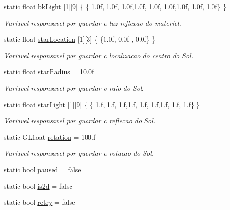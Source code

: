 \begin{DoxyCompactItemize}
static float \mbox{\hyperlink{class_scene_texture_a26f87539887244bc249e9ad4e33edb6f}{bk\+Light}} \mbox{[}1\mbox{]}\mbox{[}9\mbox{]} \{ \{ 1.\+0f, 1.\+0f, 1.\+0f,1.\+0f, 1.\+0f, 1.\+0f,1.\+0f, 1.\+0f, 1.\+0f\} \}
\begin{DoxyCompactList}\small\item\em Variavel responsavel por guardar a luz reflexao do material. \end{DoxyCompactList}\item 
static float \mbox{\hyperlink{class_scene_texture_a1987402ddcabace429e49b7f00823b3b}{star\+Location}} \mbox{[}1\mbox{]}\mbox{[}3\mbox{]} \{ \{0.\+0f, 0.\+0f , 0.\+0f\} \}
\begin{DoxyCompactList}\small\item\em Variavel responsavel por guardar a localizacao do centro do Sol. \end{DoxyCompactList}\item 
static float \mbox{\hyperlink{class_scene_texture_a79a357a19513f3fe334e44e415aa1725}{star\+Radius}} = 10.\+0f
\begin{DoxyCompactList}\small\item\em Variavel responsavel por guardar o raio do Sol. \end{DoxyCompactList}\item 
static float \mbox{\hyperlink{class_scene_texture_a07e5ffc66ac2eeeac00400230340a036}{star\+Light}} \mbox{[}1\mbox{]}\mbox{[}9\mbox{]} \{ \{ 1.f, 1.f, 1.f,1.f, 1.f, 1.f,1.f, 1.f, 1.f\} \}
\begin{DoxyCompactList}\small\item\em Variavel responsavel por guardar a reflexao do Sol. \end{DoxyCompactList}\item 
static G\+Lfloat \mbox{\hyperlink{class_scene_texture_aa57a081d184e1d120e1252bf9b282dec}{rotation}} = 100.f
\begin{DoxyCompactList}\small\item\em Variavel responsavel por guardar a rotacao do Sol. \end{DoxyCompactList}\item 
static bool \mbox{\hyperlink{class_scene_texture_a7a09bbdb36a7e736717f99c30aa76220}{paused}} = false
\item 
static bool \mbox{\hyperlink{class_scene_texture_a7c2bfeb08bcea36358e40486f4f0b845}{is2d}} = false
\item 
static bool \mbox{\hyperlink{class_scene_texture_a9effaaef46b836601ba47ffc7b680a0a}{retry}} = false
\item 

\end{DoxyCompactItemize}
